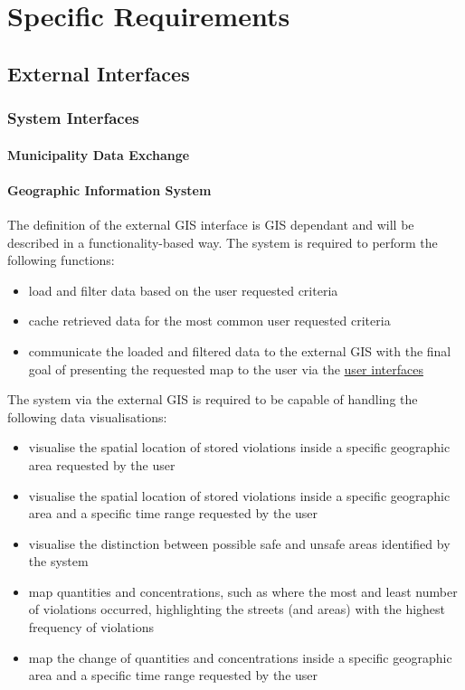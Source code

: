 \section{Specific Requirements}

\subsection{External Interfaces}

\subsubsection{System Interfaces}

\paragraph{Municipality Data Exchange}

\clearpage

\paragraph{Geographic Information System} The definition of the external GIS interface is GIS dependant and will be described in a functionality-based way. The system is required to perform the following functions:

	\begin{itemize}
		\item load and filter data based on the user requested criteria
		\item cache retrieved data for the most common user requested criteria
		\item communicate the loaded and filtered data to the external GIS with the final goal of presenting the requested map to the user via the \hyperref[sec:3userinterface]{user interfaces}
	\end{itemize}
	
	The system via the external GIS is required to be capable of handling the following data visualisations:
	
	\begin{itemize}
		\item visualise the spatial location of stored violations inside a specific geographic area requested by the user
		\item visualise the spatial location of stored violations inside a specific geographic area and a specific time range requested by the user
		\item visualise the distinction between possible safe and unsafe areas identified by the system
		\item map quantities and concentrations, such as where the most and least number of violations occurred, highlighting the streets (and areas) with the highest frequency of violations
		\item map the change of quantities and concentrations inside a specific geographic area and a specific time range requested by the user
	\end{itemize}

